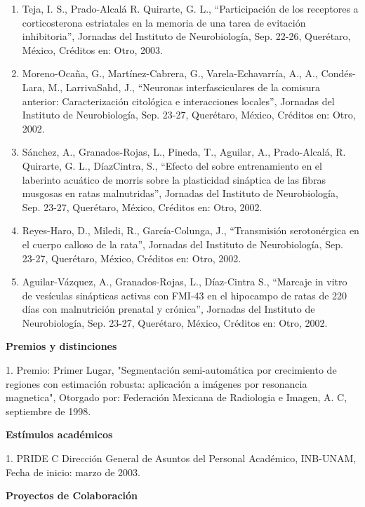 \documentclass[12pt]{article}
\begin{document}
\begin{enumerate}
\item Teja, I. S., Prado-Alcalá R. Quirarte, G. L., “Participación de los receptores a corticosterona estriatales en la memoria de una 
tarea de evitación inhibitoria”, Jornadas del Instituto de Neurobiología, Sep. 22-26, Querétaro, México, Créditos en: Otro, 2003.

\item Moreno-Ocaña, G., Martínez-Cabrera, G., Varela-Echavarría, A., A., Condés-Lara, M., LarrivaSahd, J., “Neuronas interfasciculares 
de 
la comisura anterior: Caracterización citológica e interacciones locales”, Jornadas del Instituto de Neurobiología, Sep. 23-27, 
Querétaro, México, Créditos en: Otro, 2002.

\item Sánchez, A., Granados-Rojas, L., Pineda, T., Aguilar, A., Prado-Alcalá, R. Quirarte, G. L., DíazCintra, S., “Efecto del sobre 
entrenamiento en el laberinto acuático de morris sobre la plasticidad sináptica de las fibras musgosas en ratas malnutridas”, Jornadas 
del Instituto de Neurobiología, Sep. 23-27, Querétaro, México, Créditos en: Otro, 2002.

\item Reyes-Haro, D., Miledi, R., García-Colunga, J., “Transmisión serotonérgica en el cuerpo calloso de la rata”, Jornadas del 
Instituto 
de Neurobiología, Sep. 23-27, Querétaro, México, Créditos en: Otro, 2002.

\item Aguilar-Vázquez, A., Granados-Rojas, L., Díaz-Cintra S., “Marcaje in vitro de vesículas sinápticas activas con FMI-43 en el 
hipocampo de ratas de 220 días con malnutrición prenatal y crónica”, Jornadas del Instituto de Neurobiología, Sep. 23-27, Querétaro, 
México, Créditos en: Otro, 2002.
\end{enumerate}


\textbf{Premios y distinciones}

\hfill

1. Premio: Primer Lugar, "Segmentación semi-automática por crecimiento de regiones con estimación robusta: aplicación a imágenes por 
resonancia magnetica", Otorgado por: Federación Mexicana de Radiologia e Imagen, A. C, septiembre de 1998.

\textbf{Estímulos académicos}

1. PRIDE C Dirección General de Asuntos del Personal Académico, INB-UNAM, Fecha de inicio: marzo de 2003.

\hfill

\textbf{Proyectos de Colaboración}
\end{document}
